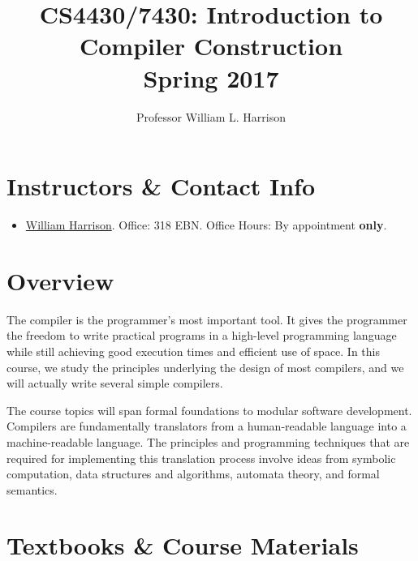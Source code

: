 \documentclass[11pt]{article}
\title{CS4430/7430: Introduction to Compiler Construction\\Spring 2017}
\author{Professor William L. Harrison}
\begin{document}
\maketitle

\section{Instructors \& Contact Info}

\begin{itemize}

\item  \href{mailto:harrisonwl@missouri.edu}{William Harrison}. Office: 318 EBN. Office Hours: By appointment {\bf only}.

\end{itemize}


\section{Overview}
The compiler is the programmer's most important tool. It gives the programmer the freedom to write practical programs in a high-level programming language while still achieving good execution times and efficient use of space. In this course, we study the principles underlying the design of most compilers, and we will actually write several simple compilers. 


The course topics will span formal foundations to modular software development. Compilers are fundamentally translators from a human-readable language into a machine-readable language. The principles and programming techniques that are required for implementing this translation process involve ideas from symbolic computation, data structures and algorithms, automata theory, and formal semantics.

\section{Textbooks \& Course Materials}
\end{document}
